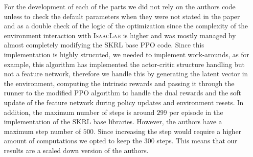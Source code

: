 \documentclass[10pt]{article} %
\begin{document}
For the development of each of the parts we did not rely on the authors code unless to check the default parameters when they were not stated in the paper and as a double check of the logic of the optimization since the complexity of the environment interaction with \textsc{IsaacLab} is higher and was mostly managed by almost completely modifying the SKRL base \textsc{PPO} code. Since this implementation is highly strucuted, we needed to implement work-arounds, as for example, this algorithm has implemented the actor-critic structure handling but not a feature network, therefore we handle this by generating the latent vector in the environment, computing the intrinsic rewards and passing it through the runner to the modified \textsc{PPO} algorithm to handle the dual rewards and the soft update of the feature network during policy updates and environment resets. In addition, the maximum number of steps is around $299$ per episode in the implementation of the SKRL base libraries. However, the authors have a maximum step number of $500$. Since increasing the step would require a higher amount of computations we opted to keep the $300$ steps. This means that our results are a scaled down version of the authors.
\end{document}
